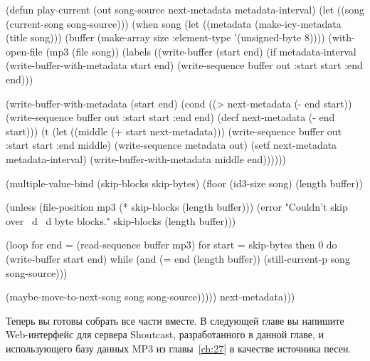 \begin{myverb}
(defun play-current (out song-source next-metadata metadata-interval)
  (let ((song (current-song song-source)))
    (when song
      (let ((metadata (make-icy-metadata (title song)))
            (buffer (make-array size :element-type '(unsigned-byte 8))))
        (with-open-file (mp3 (file song))
          (labels ((write-buffer (start end)
                     (if metadata-interval
                       (write-buffer-with-metadata start end)
                       (write-sequence buffer out :start start :end end)))

                   (write-buffer-with-metadata (start end)
                     (cond
                       ((> next-metadata (- end start))
                        (write-sequence buffer out :start start :end end)
                        (decf next-metadata (- end start)))
                       (t 
                        (let ((middle (+ start next-metadata)))
                          (write-sequence buffer out :start start :end middle)
                          (write-sequence metadata out)
                          (setf next-metadata metadata-interval)
                          (write-buffer-with-metadata middle end))))))

            (multiple-value-bind (skip-blocks skip-bytes)
                (floor (id3-size song) (length buffer))

              (unless (file-position mp3 (* skip-blocks (length buffer)))
                (error "Couldn't skip over ~d ~d byte blocks."
                       skip-blocks (length buffer)))

              (loop for end = (read-sequence buffer mp3) 
                 for start = skip-bytes then 0
                 do (write-buffer start end)
                 while (and (= end (length buffer))
                            (still-current-p song song-source)))

              (maybe-move-to-next-song song song-source)))))
      next-metadata)))
\end{myverb}

Теперь вы готовы собрать все части вместе.  В следующей главе вы напишите Web-интерфейс
для сервера Shoutcast, разработанного в данной главе, и использующего базу данных MP3 из
главы~\ref{ch:27} в качестве источника песен.

